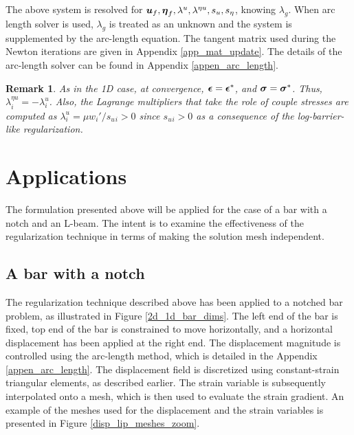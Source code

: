 \documentclass[10pt]{cas-sc}
\newtheorem*{remark}{Remark}
\begin{document}
The above system is resolved for $\mbox{\boldmath $u$}_f, \mbox{\boldmath $\eta$}_f, \lambda^u,\lambda^{\eta u},s_u,s_\eta$, knowing $\lambda_g$. When arc length solver is used, $\lambda_g$ is treated as an unknown and the system is supplemented by the arc-length equation. The tangent matrix used during the Newton iterations are given in Appendix \ref{app_mat_update}. The details of the arc-length solver can be found in Appendix \ref{appen_arc_length}.

\begin{remark}
As in the 1D case, at convergence, $\mbox{\boldmath $\epsilon$} = \mbox{\boldmath $\epsilon$}^*$, and $\mbox{\boldmath $\sigma$} = \mbox{\boldmath $\sigma$}^*$. Thus, $\lambda^{\eta u}_i = -\lambda^u_i$. Also, the Lagrange multipliers that take the role of couple stresses are computed as $\lambda^u_i  =  \mu w_i'/ s_u{_i} >0$ since $s_u{_i} >0$ as a consequence of the log-barrier-like regularization.
\end{remark}

\section{Applications}
The formulation presented above will be applied for the case of a bar with a notch and an L-beam. The intent is to examine the effectiveness of the regularization technique in terms of making the solution mesh independent. 


\subsection{A bar with a notch \label{a_bar_with_a_notch}}
The regularization technique described above has been applied to a notched bar problem, as illustrated in Figure \ref{2d_1d_bar_dims}. The left end of the bar is fixed, top end of the bar is constrained to move horizontally, and a horizontal displacement has been applied at the right end. The displacement magnitude is controlled using the arc-length method, which is detailed in the Appendix \ref{appen_arc_length}. The displacement field is discretized using constant-strain triangular elements, as described earlier. The strain variable is subsequently interpolated onto a  mesh, which is then used to evaluate the strain gradient. An example of the meshes used for the displacement and the strain variables is presented in Figure \ref{disp_lip_meshes_zoom}.
\end{document}
